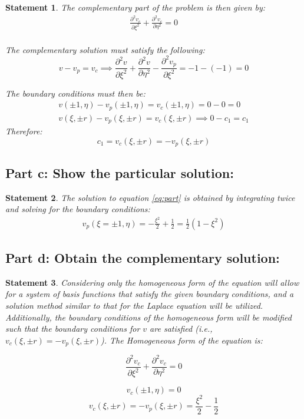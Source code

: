 \documentclass[10pt, reqno]{amsart}
\newtheorem{mydef}{Statement}
\begin{document}
\begin{mydef} The complementary part of the problem is then given by:
\begin{gather} \label{eq:hom}
\frac{\partial^2 v_c}{\partial \xi^2}+\frac{\partial^2 v_c}{\partial \eta^2}=0\\
\end{gather}


The complementary solution must satisfy the following:
\begin{equation}
v - v_p = v_c \implies \frac{\partial^2 v}{\partial \xi^2}+\frac{\partial^2 v}{\partial \eta^2} - \frac{\partial^2 v_p}{\partial \xi^2} = -1 - (-1) = 0
\end{equation}

The boundary conditions must then be:
\begin{gather}
 v(\pm1,\eta) - v_p(\pm1, \eta) = v_c(\pm1, \eta)=0 - 0 = 0\\
 v(\xi,\pm r) - v_p(\xi, \pm r) = v_c(\xi, \pm r) \implies 0 - c_1 = c_1
\end{gather}
Therefore:
\begin{equation}
c_1 = v_c(\xi, \pm r) = - v_p(\xi, \pm r)
\end{equation}
\end{mydef}

\subsection{Part c: Show the particular solution:}
\begin{mydef}
The solution to equation \ref{eq:part} is obtained by integrating twice and solving for the boundary conditions:
\begin{gather}
v_p(\xi = \pm 1, \eta) = -\frac{\xi^2}{2} + \frac{1}{2} = \frac{1}{2}(1-\xi^2)
\end{gather}
\end{mydef}

\subsection{Part d: Obtain the complementary solution:}
\begin{mydef}
Considering only the homogeneous form of the equation will allow for a system of basis functions that satisfy the given boundary conditions, and a solution method similar to that for the Laplace equation will be utilized.  Additionally, the boundary conditions of the homogeneous form will be modified such that the boundary conditions for $v$ are satisfied (i.e., $v_c(\xi, \pm r) = -v_p(\xi, \pm r)$). The Homogeneous form of the equation is:

\begin{equation} \label{eq:HomPDE}
\frac{\partial^2 v_c}{\partial \xi^2}+\frac{\partial^2 v_c}{\partial \eta^2}=0
\end{equation}

$$v_c(\pm 1, \eta)=0$$
$$v_c (\xi, \pm r)=-v_p(\xi, \pm r)=\frac{\xi^2}{2} - \frac{1}{2}$$
\end{mydef}
\end{document}
